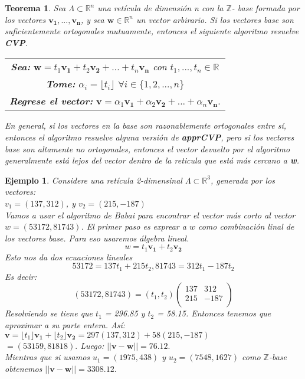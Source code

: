 \documentclass[12pt]{report}
\newtheorem{teo}{Teorema}
\newtheorem{ex}{Ejemplo}
\begin{document}
\begin{teo}
    Sea $\Lambda\subset{\mathbb{R}}^{n}$ una retícula de dimensión n con la $\mathbb{Z}$- base formada por los vectores $\mathbf{v_1}, ... ,\mathbf{v_n} $, y sea $\mathbf{w}\in \mathbb{R}^{n}$ un vector arbirario. Si los vectores base son suficientemente ortogonales mutuamente, entonces el siguiente algoritmo resuelve \textbf{CVP}.
    \begin{table}[h]
        \centering
        \begin{tabular}{| c |}
        \hline
\textbf{Sea:} $\mathbf{w} = t_{1}\mathbf{v_1} + t_{2}\mathbf{v_2} + ... + t_{n}\mathbf{v_n}$ con $t_{1}, ..., t_{n}\in \mathbb{R}$   \\
\textbf{Tome:} $\alpha_{i} = \lfloor t_{i} \rfloor$ $\forall i \in \{1,2,...,n\}$ \\
\textbf{Regrese el vector: } $\mathbf{v} = \alpha_{1}\mathbf{v_1} +  \alpha_{2}\mathbf{v_2} + ... +  \alpha_{n}\mathbf{v_n}.$\\
        \hline
        \end{tabular}
        \label{tab:my_label}
    \end{table}
En general, si los vectores en la base son razonablemente ortogonales entre sí, entonces el algoritmo resuelve alguna versión de \textbf{apprCVP}, pero si los vectores base son altamente no ortogonales, entonces el vector devuelto por el algoritmo generalmente está lejos del vector dentro de la reticula que está más cercano a \textbf{w}.
\end{teo}


\begin{ex}
Considere una retícula 2-dimensinal $\Lambda\subset \mathbb{R}^3$, generada por los vectores:\\
        $v_{1} = (137,312)$, y $v_{2} = (215,-187)$ \\
Vamos a usar el algoritmo de Babai para encontrar el vector más corto al vector $w = (53172, 81743)$.
El primer paso es exprear a $w$ como combinación linal de los vectores base. Para eso usaremos álgebra lineal.
\[ w = t_{1}\mathbf{v_1} + t_{2}\mathbf{v_2} \]
Esto nos da dos ecuaciones lineales
\[53172 = 137t_{1} + 215t_{2}, 81743 = 312t_{1} - 187t_{2}\]
Es decir:
 \[ (53172, 81743) = (t_{1},t_{2}) \left(\begin{smallmatrix}
137 &  312 \\
215 & -187 \\
\end{smallmatrix}\right)
\]
Resolviendo se tiene que $t_1$ = 296.85 y $t_2$ = 58.15. Entonces tenemos que aproximar a su parte entera. Así:\\
$\mathbf{v} = \lfloor t_1 \rfloor \mathbf{v_1} + \lfloor t_2 \rfloor \mathbf{v_2}= 297(137, 312) + 58(215, −187)$ \\
$= (53159, 81818). $
Luego: $||\mathbf{v}-\mathbf{w}|| = 76.12.$\\
Mientras que si usamos $u_1 = (1975, 438)$ y $u_2= (7548, 1627)$ como
$\mathbb{Z}$-base obtenemos $||\mathbf{v}-\mathbf{w}|| = 3308.12.$
\end{ex}
\end{document}
